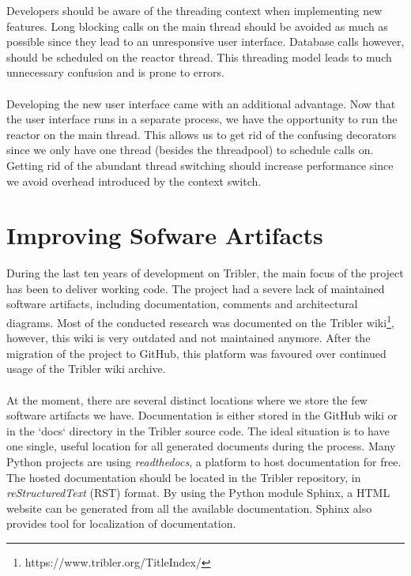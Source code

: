 Developers should be aware of the threading context when implementing new features. Long blocking calls on the main thread should be avoided as much as possible since they lead to an unresponsive user interface. Database calls however, should be scheduled on the reactor thread. This threading model leads to much unnecessary confusion and is prone to errors.\\\\
Developing the new user interface came with an additional advantage. Now that the user interface runs in a separate process, we have the opportunity to run the reactor on the main thread. This allows us to get rid of the confusing decorators since we only have one thread (besides the threadpool) to schedule calls on. Getting rid of the abundant thread switching should increase performance since we avoid overhead introduced by the context switch.

\section{Improving Sofware Artifacts}
During the last ten years of development on Tribler, the main focus of the project has been to deliver working code. The project had a severe lack of maintained software artifacts, including documentation, comments and architectural diagrams. Most of the conducted research was documented on the Tribler wiki\footnote{https://www.tribler.org/TitleIndex/}, however, this wiki is very outdated and not maintained anymore. After the migration of the project to GitHub, this platform was favoured over continued usage of the Tribler wiki archive.\\\\
At the moment, there are several distinct locations where we store the few software artifacts we have. Documentation is either stored in the GitHub wiki or in the `docs` directory in the Tribler source code. The ideal situation is to have one single, useful location for all generated documents during the process. Many Python projects are using \emph{readthedocs}, a platform to host documentation for free. The hosted documentation should be located in the Tribler repository, in \emph{reStructuredText} (RST) format. By using the Python module Sphinx, a HTML website can be generated from all the available documentation. Sphinx also provides tool for localization of documentation.

